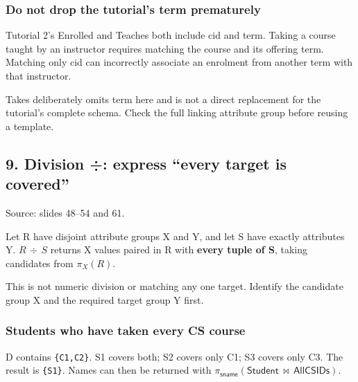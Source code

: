 \subsubsection{Do not drop the tutorial's term prematurely}\label{05_relational_algebra_en-do-not-drop-the-tutorials-term-prematurely}

Tutorial 2's Enrolled and Teaches both include cid and term. Taking a course taught by an instructor requires matching the course and its offering term. Matching only cid can incorrectly associate an enrolment from another term with that instructor.

Takes deliberately omits term here and is not a direct replacement for the tutorial's complete schema. Check the full linking attribute group before reusing a template.

\Needspace{11cm}
\subsection{9. Division ÷: express ``every target is covered''}\label{05_relational_algebra_en-division-express-every-target-is-covered}


Source: slides 48--54 and 61.

Let R have disjoint attribute groups X and Y, and let S have exactly attributes Y. \(R\,\div \,S\) returns X values paired in R with \textbf{every tuple of S}, taking candidates from \(\pi _{X}(R)\).


This is not numeric division or matching any one target. Identify the candidate group X and the required target group Y first.

\subsubsection{Students who have taken every CS course}\label{05_relational_algebra_en-students-who-have-taken-every-cs-course}


D contains \texttt{\{C1,C2\}}. S1 covers both; S2 covers only C1; S3 covers only C3. The result is \texttt{\{S1\}}. Names can then be returned with \(\pi _{\mathsf{sname}}(\mathsf{Student}\,\bowtie \,\mathsf{AllCSIDs})\).

